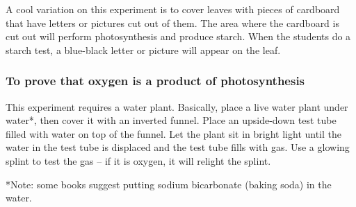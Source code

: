 A cool variation on this experiment is to cover leaves with pieces of cardboard that have letters or pictures cut out of them. The area where the cardboard is cut out will perform photosynthesis and produce starch. When the students do a starch test, a blue-black letter or picture will appear on the leaf.

\subsubsection{To prove that oxygen is a product of photosynthesis}
This experiment requires a water plant. Basically, place a live water plant under water*, then cover it with an inverted funnel. Place an upside-down test tube filled with water on top of the funnel. Let the plant sit in bright light until the water in the test tube is displaced and the test tube fills with gas. Use a glowing splint to test the gas -- if it is oxygen, it will relight the splint.

*Note: some books suggest putting sodium bicarbonate (baking soda) in the water.
